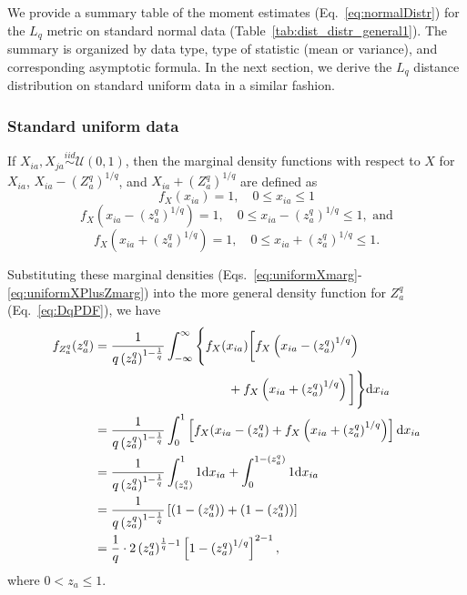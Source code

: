 \documentclass[aos]{imsart}
\begin{document}
We provide a summary table of the moment estimates (Eq.~\ref{eq:normalDistr}) for the $L_q$ metric on standard normal data (Table~\ref{tab:dist_distr_general1}). The summary is organized by data type, type of statistic (mean or variance), and corresponding asymptotic formula. In the next section, we derive the $L_q$ distance distribution on standard uniform data in a similar fashion.

\subsubsection{Standard uniform data}

If $X_{ia},X_{ja} \overset{iid}{\sim} \mathcal{U}(0,1)$, then the marginal density functions with respect to $X$ for $X_{ia}$, $X_{ia} - \left(Z^q_a\right)^{1/q}$, and $X_{ia} + \left(Z^q_a\right)^{1/q}$ are defined as
%
\begin{equation}\label{eq:uniformXmarg}
f_X(x_{ia}) = 1, \quad 0 \leq x_{ia} \leq 1
\end{equation}
%
\begin{equation}\label{eq:uniformXMinusZmarg}
f_X\left(x_{ia} - \left(z^q_a\right)^{1/q}\right) = 1, \quad 0 \leq x_{ia} - \left(z^q_a\right)^{1/q} \leq 1, \text{ and}
\end{equation}
%
\begin{equation}\label{eq:uniformXPlusZmarg}
f_X\left(x_{ia} + \left(z^q_a\right)^{1/q}\right) = 1, \quad 0 \leq x_{ia} + \left(z^q_a\right)^{1/q} \leq 1.
\end{equation}

Substituting these marginal densities (Eqs.~\ref{eq:uniformXmarg}-\ref{eq:uniformXPlusZmarg}) into the more general density function for $Z^q_a$ (Eq.~\ref{eq:DqPDF}), we have
%
\begin{equation}\label{eq:uniformDqPDF}
\begin{aligned}
f_{Z^q_a}(z^q_a) &= \frac{1}{q\left(z^q_a\right)^{1 - \frac{1}{q}}}\int_{-\infty}^{\infty}{\Biggl\{}f_X(x_{ia}){\biggl[}f_X\left(x_{ia} - \left(z^q_a\right)^{1/q}\right)\\ 
&\hspace{3.7cm}+ f_X\left(x_{ia} + \left(z^q_a\right)^{1/q}\right){\biggr]}{\Biggl\}}\text{d}x_{ia}\\
&= \frac{1}{q\left(z^q_a\right)^{1 - \frac{1}{q}}}\int_{0}^{1}\left[f_X(x_{ia} - \left(z^q_a\right) + f_X\left(x_{ia} + \left(z^q_a\right)^{1/q}\right)\right]\text{d}x_{ia} \\
&= \frac{1}{q\left(z^q_a\right)^{1 - \frac{1}{q}}}\int_{\left(z^q_a\right)}^{1}1\text{d}x_{ia} + \int_{0}^{1 - \left(z^q_a\right)}1\text{d}x_{ia}\\
&= \frac{1}{q\left(z^q_a\right)^{1 - \frac{1}{q}}}\left[\left(1 - \left(z^q_a\right)\right) + \left(1 - \left(z^q_a\right)\right)\right]\\
&= \frac{1}{q} \cdot 2 \left(z^q_a\right)^{\frac{1}{q} - 1}\left[1 - \left(z^q_a\right)^{1/q}\right]^{2 - 1},
\end{aligned}
\end{equation}
%
where $0 < z_a \leq 1$.
\end{document}
